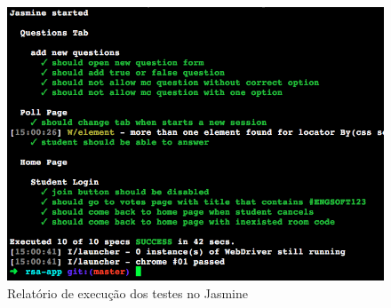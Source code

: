 \begin{figure}[!ht]
  \centering
  \caption{Relatório de execução dos testes no Jasmine}
  \label{fig:protractor_output}
  \includegraphics[scale=0.6,valign=t]{imagens/jasmine_test}
  \doautor
\end{figure}
